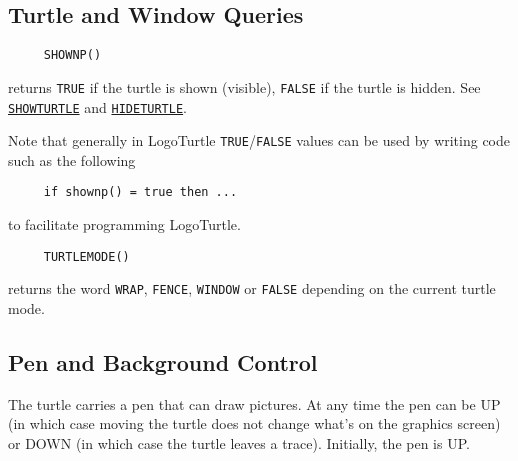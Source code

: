 \subsection{Turtle and Window Queries}

\begin{verbatim}
     SHOWNP()
\end{verbatim}
returns \texttt{TRUE} if the turtle is shown (visible), \texttt{FALSE}
if the turtle is hidden.  See
\hyperref[logoturtle:showturtle]{\texttt{SHOWTURTLE}} and
\hyperref[logoturtle:hideturtle]{\texttt{HIDETURTLE}}.

Note that generally in LogoTurtle \texttt{TRUE}/\texttt{FALSE} values
can be used by writing code such as the following
\begin{verbatim}
     if shownp() = true then ...
\end{verbatim}
to facilitate programming LogoTurtle.

\begin{verbatim}
     TURTLEMODE()
\end{verbatim}
returns the word \texttt{WRAP}, \texttt{FENCE}, \texttt{WINDOW} or
\texttt{FALSE} depending on the current turtle mode.



\subsection{Pen and Background Control}
\label{logoturtle:PBC}

The turtle carries a pen that can draw pictures.  At any time the pen
can be UP (in which case moving the turtle does not change what's on the
graphics screen) or DOWN (in which case the turtle leaves a trace).
Initially, the pen is UP.

